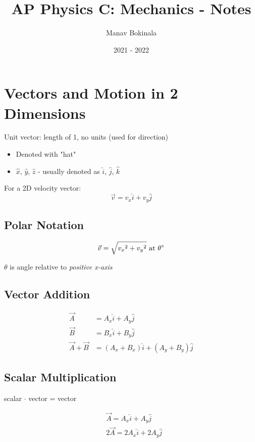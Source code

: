 \documentclass[titlepage]{article}
\title{AP Physics C: Mechanics - Notes}
\author{Manav Bokinala}
\date{2021 - 2022}
\begin{document}
\maketitle

\newpage
\tableofcontents
\newpage

\section{Vectors and Motion in 2 Dimensions}
Unit vector: length of 1, no units (used for direction)

\begin{itemize}
    \item Denoted with "hat"
    \item $\hat{x}$, $\hat{y}$, $\hat{z}$ - usually denoted as $\hat{i}$, $\hat{j}$, $\hat{k}$
\end{itemize}

For a 2D velocity vector:
\[ \vec{v} = v_x \hat{i} + v_y \hat{j} \]

\subsection{Polar Notation}
\[ \vec{v} = \sqrt{{v_x}^2 + {v_y}^2} \text{ at } \theta \degree \]

$\theta$ is angle relative to \emph{positive x-axis}

\subsection{Vector Addition}
\begin{align*}
    \vec{A}           & = A_x \hat{i} + A_y \hat{j}                 \\
    \vec{B}           & = B_x \hat{i} + B_y \hat{j}                 \\
    \vec{A} + \vec{B} & = (A_x + B_x) \hat{i} + (A_y + B_y) \hat{j}
\end{align*}

\subsection{Scalar Multiplication}
scalar $\cdot$ vector = vector

\begin{align*}
     & \vec{A} = A_x \hat{i} + A_y \hat{j}    \\
     & 2\vec{A} = 2A_x \hat{i} + 2A_y \hat{j}
\end{align*}
\end{document}
